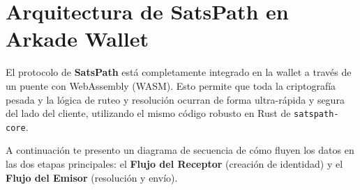 \documentclass[
]{article}
\author{}
\date{}
\begin{document}
\hypertarget{arquitectura-de-satspath-en-arkade-wallet}{%
\section{Arquitectura de SatsPath en Arkade
Wallet}\label{arquitectura-de-satspath-en-arkade-wallet}}

El protocolo de \textbf{SatsPath} está completamente integrado en la
wallet a través de un puente con WebAssembly (WASM). Esto permite que
toda la criptografía pesada y la lógica de ruteo y resolución ocurran de
forma ultra-rápida y segura del lado del cliente, utilizando el mismo
código robusto en Rust de \texttt{satspath-core}.

A continuación te presento un diagrama de secuencia de cómo fluyen los
datos en las dos etapas principales: el \textbf{Flujo del Receptor}
(creación de identidad) y el \textbf{Flujo del Emisor} (resolución y
envío).
\end{document}
